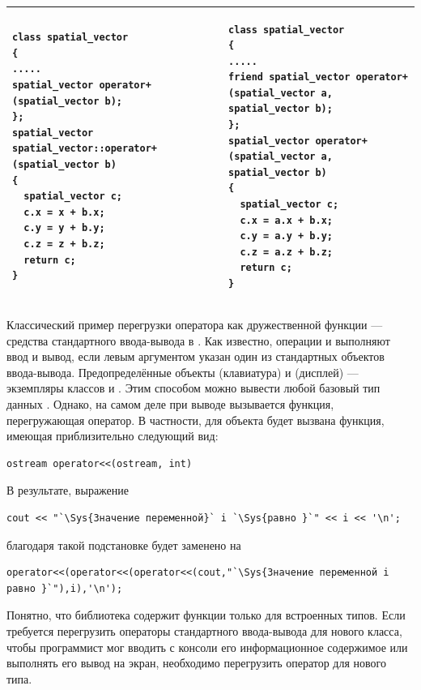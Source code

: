 \begin{center}
\begin{tabular}{|p{}|p{}|}
\hline
\begin{lstlisting}
class spatial_vector 
{
.....
spatial_vector operator+(spatial_vector b);
};
spatial_vector spatial_vector::operator+(spatial_vector b) 
{
  spatial_vector c;
  c.x = x + b.x;
  c.y = y + b.y;
  c.z = z + b.z;
  return c;
}
\end{lstlisting}
&
\begin{lstlisting}
class spatial_vector 
{
.....
friend spatial_vector operator+(spatial_vector a, spatial_vector b);
};
spatial_vector operator+(spatial_vector a, spatial_vector b) 
{
  spatial_vector c;
  c.x = a.x + b.x;
  c.y = a.y + b.y;
  c.z = a.z + b.z;
  return c;
}
\end{lstlisting}
\\\hline
\end{tabular}
\end{center}

Классический пример перегрузки оператора как дружественной функции --- средства стандартного ввода-вывода в . Как
известно, операции \Sys{{<}{<}} и
\Sys{{>}{>}} выполняют ввод и вывод, если левым аргументом указан один из
стандартных объектов ввода-вывода. Предопределённые объекты  (клавиатура) и
 (дисплей) --- экземпляры классов  и
. Этим способом можно вывести любой базовый тип данных . Однако, на самом деле при
выводе вызывается функция, перегружающая оператор. В частности, для объекта  будет вызвана
функция, имеющая приблизительно следующий вид:
\begin{lstlisting}
ostream operator<<(ostream, int)
\end{lstlisting}

В результате, выражение 
\begin{lstlisting}
cout << "`\Sys{Значение переменной}` i `\Sys{равно }`" << i << '\n';
\end{lstlisting}
благодаря такой подстановке будет заменено на
\begin{lstlisting}
operator<<(operator<<(operator<<(cout,"`\Sys{Значение переменной i равно }`"),i),'\n');
\end{lstlisting}

Понятно, что библиотека  содержит функции только для встроенных типов. Если требуется
перегрузить операторы стандартного ввода-вывода для нового класса, чтобы программист мог вводить с консоли его
информационное содержимое или выполнять его вывод на экран, необходимо перегрузить оператор для нового типа. 

